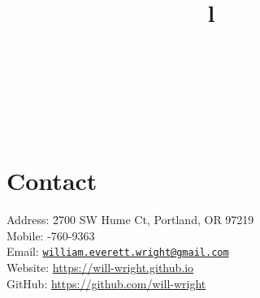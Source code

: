 \documentclass[12pt,margintitle,line]{res}
\begin{document}
\pagestyle{fancy}  
\fancyhf{}                  %
\renewcommand{\headrulewidth}{0.0pt}



\begin{resume}

\fancyhead{} %
\cfoot{\thepage}

\begin{format}
\\
\title{l}\\
\body\\
\end{format}

\vspace{-0.2cm}

\section{Contact}
\vspace{-0.45cm}
\begin{tabbing}
Address: \= 2700 SW Hume Ct, Portland, OR 97219 \\
Mobile: -760-9363 \\
Email: \> \href{mailto:william.everett.wright@gmail.com}{\nolinkurl{william.everett.wright@gmail.com}} \\
Website: \> \url{https://will-wright.github.io} \\
GitHub: \> \url{https://github.com/will-wright} \\
\end{tabbing}


\end{resume}
\end{document}
